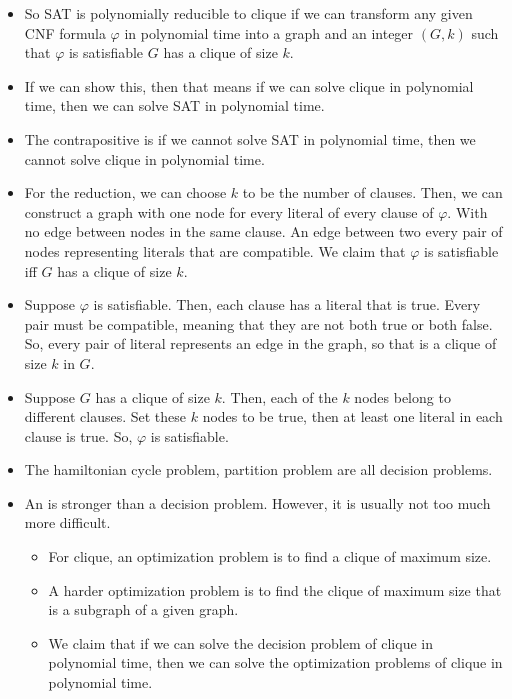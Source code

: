 \documentclass[a4paper,12pt]{article}
\begin{document}
\begin{itemize}
    \item So SAT is polynomially reducible to clique if we can transform any given CNF formula $\varphi$ in polynomial time into a graph and an integer $(G,k)$ such that $\varphi$ is satisfiable  $G$ has a clique of size $k.$
    \item If we can show this, then that means if we can solve clique in polynomial time, then we can solve SAT in polynomial time.
    \item The contrapositive is if we cannot solve SAT in polynomial time, then we cannot solve clique in polynomial time.
    \item For the reduction, we can choose $k$ to be the number of clauses. Then, we can construct a graph with one node for every literal of every clause of $\varphi.$ With no edge between nodes in the same clause. An edge between two every pair of nodes representing literals that are compatible. We claim that $\varphi$ is satisfiable iff $G$ has a clique of size $k.$
    \item Suppose $\varphi$ is satisfiable. Then, each clause has a literal that is true. Every pair must be compatible, meaning that they are not both true or both false. So, every pair of literal represents an edge in the graph, so that is a clique of size $k$ in $G$.
    \item Suppose $G$ has a clique of size $k.$ Then, each of the $k$ nodes belong to different clauses. Set these $k$ nodes to be true, then at least one literal in each clause is true. So, $\varphi$ is satisfiable.
    \item The hamiltonian cycle problem, partition problem are all decision problems.
    \item An  is stronger than a decision problem. However, it is usually not too much more difficult.\begin{itemize}
        \item For clique, an optimization problem is to find a clique of maximum size.
        \item A harder optimization problem is to find the clique of maximum size that is a subgraph of a given graph.
        \item We claim that if we can solve the decision problem of clique in polynomial time, then we can solve the optimization problems of clique in polynomial time.
    \end{itemize}
\end{itemize}
\end{document}
